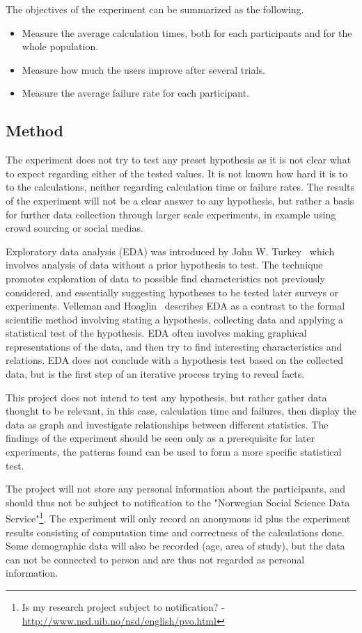 \par The objectives of the experiment can be summarized as the following.
\begin{itemize}
    \item Measure the average calculation times, both for each participants and for the whole population.
    \item Measure how much the users improve after several trials.
    \item Measure the average failure rate for each participant.
\end{itemize}


\subsection{Method}
The experiment does not try to test any preset hypothesis as it is not clear what to expect regarding either of the tested values. It is not known how hard it is to to the calculations, neither regarding calculation time or failure rates. The results of the experiment will not be a clear answer to any hypothesis, but rather a basis for further data collection through larger scale experiments, in example using crowd sourcing or social medias.

\par Exploratory data analysis (EDA) was introduced by John W. Turkey~\cite{turkey} which involves analysis of data without a prior hypothesis to test. The technique promotes exploration of data to possible find characteristics not previously considered, and essentially suggesting hypotheses to be tested later surveys or experiments. Velleman and Hoaglin~\cite{exploratory-analysis} describes EDA as a contrast to the formal scientific method involving stating a hypothesis, collecting data and applying a statistical test of the hypothesis. EDA often involves making graphical representations of the data, and then try to find interesting characteristics and relations. EDA does not conclude with a hypothesis test based on the collected data, but is the first step of an iterative process trying to reveal facts. 
\par This project does not intend to test any hypothesis, but rather gather data thought to be relevant, in this case, calculation time and failures, then display the data as graph and investigate relationships between different statistics. The findings of the experiment should be seen only as a prerequisite for later experiments, the patterns found can be used to form a more specific statistical test.
\par The project will not store any personal information about the participants, and should thus not be subject to notification to the "Norwegian Social Science Data Service"\footnote{Is my research project subject to notification? - \url{http://www.nsd.uib.no/nsd/english/pvo.html}}. The experiment will only record an anonymous id plus the experiment results consisting of computation time and correctness of the calculations done. Some demographic data will also be recorded (age, area of study), but the data can not be connected to person and are thus not regarded as personal information.

